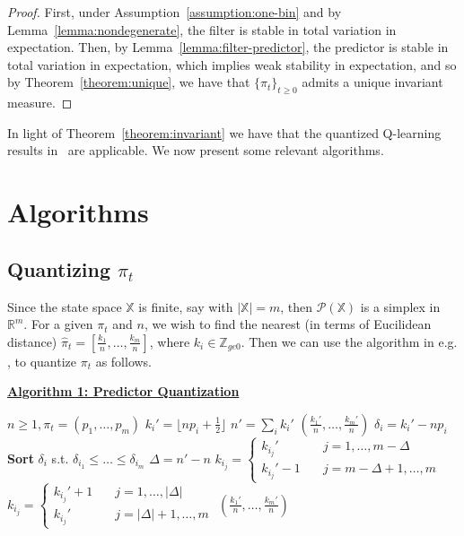 \documentclass[conference, draftcls, onecolumn]{IEEEtran}
\begin{document}
\begin{proof}
    First, under Assumption~\ref{assumption:one-bin} and by Lemma~\ref{lemma:nondegenerate}, the filter is stable in total variation in expectation. Then, by Lemma~\ref{lemma:filter-predictor}, the predictor is stable in total variation in expectation, which implies weak stability in expectation, and so by Theorem~\ref{theorem:unique}, we have that \( \{\pi_t\}_{t\ge0} \) admits a unique invariant measure.
\end{proof}

In light of Theorem~\ref{theorem:invariant} we have that the quantized Q-learning results in~\cite{Kara} are applicable. We now present some relevant algorithms.

\section{Algorithms}\label{section:Algorithms}
\subsection{Quantizing \( \pi_t \)}\label{algorithm1}
Since the state space \( \mathbb{X} \) is finite, say with \( |\mathbb{X}| = m \), then \( \mathcal{P}(\mathbb{X}) \) is a simplex in \( \mathbb{R}^m \). For a given \( \pi_t \) and \( n \), we wish to find the nearest (in terms of Eucilidean distance) \( \hat{\pi}_t = [\frac{k_1}{n}, \ldots, \frac{k_m}{n}] \), where \( k_i \in \mathbb{Z}_{ge0} \). Then we can use the algorithm in e.g. \cite{Reznik}, \cite{Saldi} to quantize \(\pi_t\) as follows. %

\vspace{1em}

\noindent \underline{\textbf{Algorithm 1: Predictor Quantization}}

\begin{algorithmic}[1]
    \REQUIRE \( n\ge1, \pi_t = (p_1, \ldots, p_m) \)
    \STATE \(k_i' = \lfloor np_i + \frac{1}{2} \rfloor\)
    \ENDFOR
    \STATE \(n' = \sum_i k_i'\)
    \RETURN \((\frac{k_1'}{n}, \ldots, \frac{k_m'}{n})\)
    \ENDIF
    \STATE \( \delta_i = k_i' - np_i\)
    \ENDFOR
    \STATE \textbf{Sort} \( \delta_i \) s.t. \( \delta_{i_1} \le \ldots \le \delta_{i_m} \)
    \STATE \( \Delta = n'-n \)
    \STATE \(k_{i_j} = \begin{cases}
        k_{i_j}' \quad   & j = 1,\ldots,m-\Delta   \\
        k_{i_j}'-1 \quad & j = m-\Delta+1,\ldots,m
    \end{cases}\)
    \ELSE
    \STATE \(k_{i_j} = \begin{cases} k_{i_j}'+1 \quad & j = 1,\ldots,|\Delta| \\ k_{i_j}' \quad   & j = |\Delta|+1,\ldots,m \end{cases}\)
    \ENDIF
    \RETURN \((\frac{k_1'}{n}, \ldots, \frac{k_m'}{n}) \)
\end{algorithmic}
\end{document}
